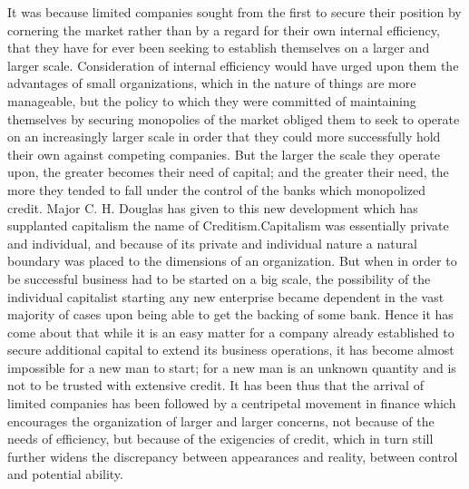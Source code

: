 \documentclass{book}
\begin{document}
It was because limited companies sought from the first to secure their position by cornering the market rather than by a regard for their own internal efficiency, that they have for ever been seeking to establish themselves on a larger and larger scale. Consideration of internal efficiency would have urged upon them the advantages of small organizations, which in the nature of things are more manageable, but the policy to which they were committed of maintaining themselves by securing monopolies of the market obliged them to seek to operate on an increasingly larger scale in order that they could more successfully hold their own against competing companies. But the larger the scale they operate upon, the greater becomes their need of capital; and the greater their need, the more they tended to fall under the control of the banks which monopolized credit. Major C. H. Douglas has given to this new development which has supplanted capitalism the name of Creditism.\footnotemark[3] Capitalism was essentially private and individual, and because of its private and individual nature a natural boundary was placed to the dimensions of an organization. But when in order to be successful business had to be started on a big scale, the possibility of the individual capitalist starting any new enterprise became dependent in the vast majority of cases upon being able to get the backing of some bank. Hence it has come about that while it is an easy matter for a company already established to secure additional capital to extend its business operations, it has become almost impossible for a new man to start; for a new man is an unknown quantity and is not to be trusted with extensive credit. It has been thus that the arrival of limited companies has been followed by a centripetal movement in finance which encourages the organization of larger and larger concerns, not because of the needs of efficiency, but because of the exigencies of credit, which in turn still further widens the discrepancy between appearances and reality, between control and potential ability.
\end{document}

